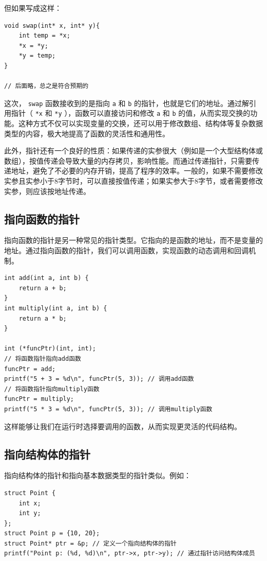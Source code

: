 但如果写成这样：
\begin{verbatim}
void swap(int* x, int* y){
    int temp = *x;
    *x = *y;
    *y = temp;
}

// 后面略，总之是符合预期的
\end{verbatim}
这次， \verb|swap| 函数接收到的是指向 \verb|a| 和 \verb|b| 的指针，也就是它们的地址。通过解引用指针（ \verb|*x| 和 \verb|*y| ），函数可以直接访问和修改 \verb|a| 和 \verb|b| 的值，从而实现交换的功能。这种方式不仅可以实现变量的交换，还可以用于修改数组、结构体等复杂数据类型的内容，极大地提高了函数的灵活性和通用性。

此外，指针还有一个良好的性质：如果传递的实参很大（例如是一个大型结构体或数组），按值传递会导致大量的内存拷贝，影响性能。而通过传递指针，只需要传递地址，避免了不必要的内存开销，提高了程序的效率。一般的，如果不需要修改实参且实参小于8字节时，可以直接按值传递；如果实参大于8字节，或者需要修改实参，则应该按地址传递。

\subsection{指向函数的指针}

指向函数的指针是另一种常见的指针类型。它指向的是函数的地址，而不是变量的地址。通过指向函数的指针，我们可以调用函数，实现函数的动态调用和回调机制。

\begin{verbatim}
int add(int a, int b) {
    return a + b;
}
int multiply(int a, int b) {
    return a * b;
}

int (*funcPtr)(int, int);
// 将函数指针指向add函数
funcPtr = add;
printf("5 + 3 = %d\n", funcPtr(5, 3)); // 调用add函数
// 将函数指针指向multiply函数
funcPtr = multiply;
printf("5 * 3 = %d\n", funcPtr(5, 3)); // 调用multiply函数
\end{verbatim}

这样能够让我们在运行时选择要调用的函数，从而实现更灵活的代码结构。

\subsection{指向结构体的指针}

指向结构体的指针和指向基本数据类型的指针类似。例如：
\begin{verbatim}
struct Point {
    int x;
    int y;
};
struct Point p = {10, 20};
struct Point* ptr = &p; // 定义一个指向结构体的指针
printf("Point p: (%d, %d)\n", ptr->x, ptr->y); // 通过指针访问结构体成员
\end{verbatim}

